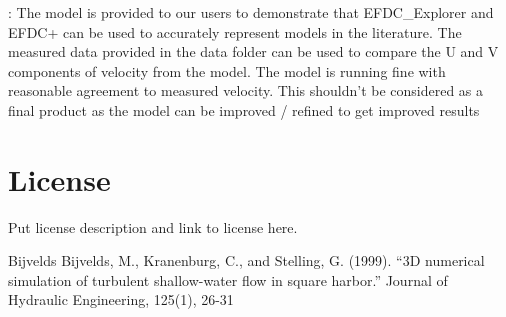 \documentclass[letterpaper,10pt,english]{sphinxmanual}
\begin{document}
: The model is provided to our users to demonstrate that EFDC\_Explorer and EFDC+ can be used to accurately represent models in the literature. The measured data provided in the data folder can be used to compare the U and V components of velocity from the model. The model is running fine with reasonable agreement to measured velocity. This shouldn’t be considered as a final product as the model can be improved / refined to get improved results


\section{License}
\label{\detokenize{license:license}}\label{\detokenize{license:id1}}\label{\detokenize{license::doc}}
Put license description and link to license here.

\begin{sphinxthebibliography}{Bijvelds}
Bijvelds, M., Kranenburg, C., and Stelling, G. (1999). “3D numerical simulation of turbulent shallow-water flow in square harbor.” Journal of Hydraulic Engineering, 125(1), 26-31
\end{sphinxthebibliography}



\renewcommand{\indexname}{Index}
\printindex
\end{document}
